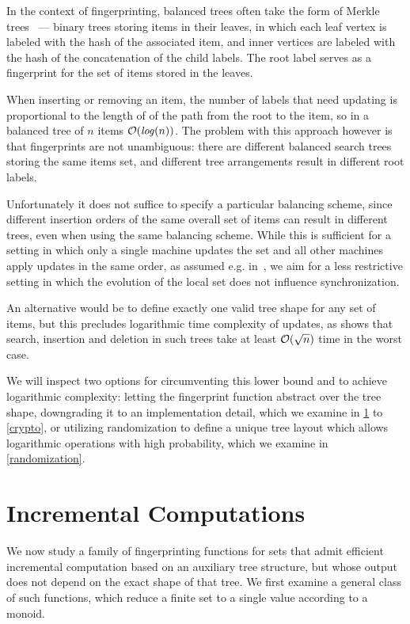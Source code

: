 In the context of fingerprinting, balanced trees often take the form of Merkle trees~\cite{merkle1989certified} --- binary trees storing items in their leaves, in which each leaf vertex is labeled with the hash of the associated item, and inner vertices are labeled with the hash of the concatenation of the child labels. The root label serves as a fingerprint for the set of items stored in the leaves.

When inserting or removing an item, the number of labels that need updating is proportional to the length of of the path from the root to the item, so in a balanced tree of $n$ items $\mathcal{O}(\mathit{log}(n))$. The problem with this approach however is that fingerprints are not unambiguous: there are different balanced search trees storing the same items set, and different tree arrangements result in different root labels.

Unfortunately it does not suffice to specify a particular balancing scheme, since different insertion orders of the same overall set of items can result in different trees, even when using the same balancing scheme. While this is sufficient for a setting in which only a single machine updates the set and all other machines apply updates in the same order, as assumed e.g. in~\cite{naor2000certificate}, we aim for a less restrictive setting in which the evolution of the local set does not influence synchronization.

An alternative would be to define exactly one valid tree shape for any set of items, but this precludes logarithmic time complexity of updates, as \cite{uniquerepresentation} shows that search, insertion and deletion in such trees take at least $\mathcal{O}(\sqrt{n})$ time in the worst case.

We will inspect two options for circumventing this lower bound and to achieve logarithmic complexity: letting the fingerprint function abstract over the tree shape, downgrading it to an implementation detail, which we examine in \cref{group-fingerprints} to \cref{crypto}, or utilizing randomization to define a unique tree layout which allows logarithmic operations with high probability, which we examine in \cref{randomization}.

\section{Incremental Computations}
\label{group-fingerprints}

We now study a family of fingerprinting functions for sets that admit efficient incremental computation based on an auxiliary tree structure, but whose output does not depend on the exact shape of that tree. We first examine a general class of such functions, which reduce a finite set to a single value according to a monoid.

